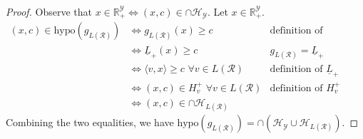 \documentclass[twoside,11pt]{article}
\newcommand{\Comments}{1}
\newcommand{\mytodo}[2]{\ifnum\Comments=1%
  \todo[linecolor=#1!80!black,backgroundcolor=#1,bordercolor=#1!80!black]{#2}\fi}
\newcommand{\raft}[1]{\mytodo{green!20!white}{RF: #1}}
\newcommand{\reals}{\mathbb{R}}
\renewcommand{\H}{\mathcal{H}}
\newcommand{\R}{\mathcal{R}}
\newcommand{\V}{\mathcal{V}}
\newcommand{\Y}{\mathcal{Y}}
\newcommand{\risk}[1]{\underline{#1}}
\newcommand{\inprod}[2]{\langle #1, #2 \rangle}%
\newcommand{\relint}{\mathrm{relint}}
\newcommand{\hyp}{\mathrm{hypo}}
\begin{document}
\begin{proof}
	Observe that $x \in \reals^\Y_+ \iff (x, c) \in \cap \H_\Y$.
	Let $x \in \reals^\Y_+$.
	\begin{align*}
	(x,c) \in \hyp(g_{L(\R)})
	&\iff g_{L(\R)}(x) \geq c & \text{definition of hypograph}\\
	&\iff \risk L_+(x) \geq c & \text{$g_{L(\R)}=\risk L_+$}\\
    &\iff \inprod{v}{x} \geq c \,\, \forall v \in {L(\R)} & \text{definition of $\risk L_+$} \\
	&\iff (x,c) \in H^+_{v} \,\, \forall v \in {L(\R)} & \text{definition of $H^+_v$}\\
	&\iff (x,c) \in \cap \H_{L(\R)} & 
	\end{align*}
	Combining the two equalities, we have $\hyp(g_{L(\R)}) = \cap (\H_\Y \cup \H_{L(\R)})$.

\end{proof}
\end{document}
